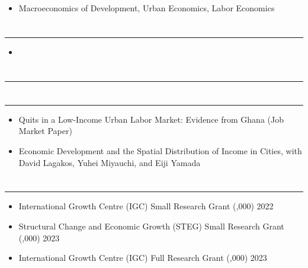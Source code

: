 \documentclass[12pt]{article}
\newenvironment{customitemize}
{ \begin{itemize}[leftmargin=\parindent, topsep = 1pt, itemsep = -1pt] }
{\end{itemize} }
\begin{document}
\begin{customitemize}
	\item Macroeconomics of Development, Urban Economics, Labor Economics
\end{customitemize}


\section*{}
\noindent \rule{\textwidth}{1pt} 
\begin{customitemize}
	\item {}
\end{customitemize}

\section*{}
\noindent \rule{\textwidth}{1pt} 

\section*{}
\noindent \rule{\textwidth}{1pt} 
\begin{customitemize}
	\item Quits in a Low-Income Urban Labor Market: Evidence from Ghana (Job Market Paper)
	\item Economic Development and the Spatial Distribution of Income in Cities, with David Lagakos, Yuhei Miyauchi, and Eiji Yamada
\end{customitemize}

\section*{}
\noindent \rule{\textwidth}{1pt} 

\begin{customitemize}
	\item International Growth Centre (IGC) Small Research Grant (,000) \hfill 2022
	\item Structural Change and Economic Growth (STEG) Small Research Grant (,000) \hfill 2023
	\item International Growth Centre (IGC) Full Research Grant (,000) \hfill 2023
\end{customitemize}


\end{document}
